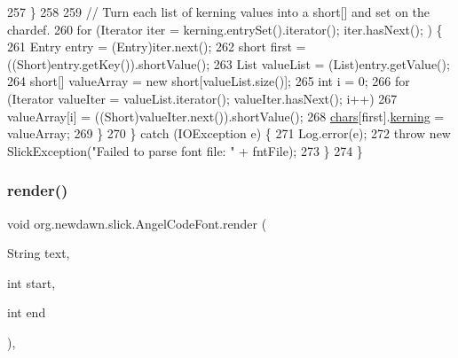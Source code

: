 \begin{DoxyCode}
257             \}
258 
259             \textcolor{comment}{// Turn each list of kerning values into a short[] and set on the chardef. }
260             \textcolor{keywordflow}{for} (Iterator iter = kerning.entrySet().iterator(); iter.hasNext(); ) \{
261                 Entry entry = (Entry)iter.next();
262                 \textcolor{keywordtype}{short} first = ((Short)entry.getKey()).shortValue();
263                 List valueList = (List)entry.getValue();
264                 \textcolor{keywordtype}{short}[] valueArray = \textcolor{keyword}{new} \textcolor{keywordtype}{short}[valueList.size()];
265                 \textcolor{keywordtype}{int} i = 0;
266                 \textcolor{keywordflow}{for} (Iterator valueIter = valueList.iterator(); valueIter.hasNext(); i++)
267                     valueArray[i] = ((Short)valueIter.next()).shortValue();
268                 \mbox{\hyperlink{classorg_1_1newdawn_1_1slick_1_1_angel_code_font_acdb3d26438f0f30d33db0a543715a3b1}{chars}}[first].\mbox{\hyperlink{classorg_1_1newdawn_1_1slick_1_1_angel_code_font_1_1_char_def_a8eea71c0865ccf322a262f877cf4245b}{kerning}} = valueArray;
269             \}
270         \} \textcolor{keywordflow}{catch} (IOException e) \{
271             Log.error(e);
272             \textcolor{keywordflow}{throw} \textcolor{keyword}{new} SlickException(\textcolor{stringliteral}{"Failed to parse font file: "} + fntFile);
273         \}
274     \}
\end{DoxyCode}
\mbox{\label{classorg_1_1newdawn_1_1slick_1_1_angel_code_font_a9e742aa7b9ef84525a6e33bedcefd421}} 
\subsubsection{\texorpdfstring{render()}{render()}}
{\footnotesize\ttfamily void org.\+newdawn.\+slick.\+Angel\+Code\+Font.\+render (\begin{DoxyParamCaption}\item[{String}]{text,  }\item[{int}]{start,  }\item[{int}]{end }\end{DoxyParamCaption})\hspace{0.3cm}{\ttfamily [inline]}, {\ttfamily [private]}}

